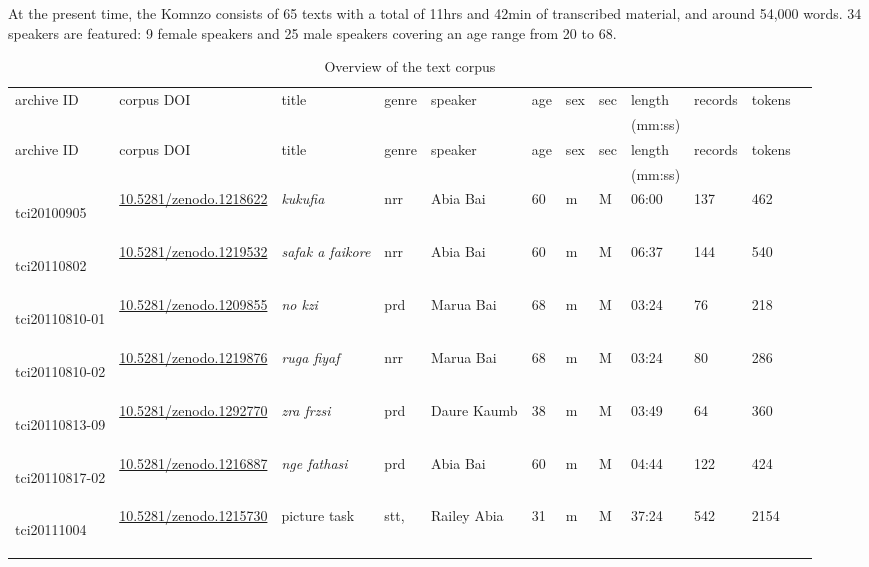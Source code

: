 At the present time, the Komnzo  consists of 65 texts with a total of 11hrs and 42min of transcribed material, and around 54,000 words. 34 speakers are featured: 9 female speakers and 25 male speakers covering an age range from 20 to 68.
\begin{landscape}
	{\renewcommand{\tabcolsep}{3pt}
\begin{longtable}{p{}lllllllllll}
\caption[Overview of the text corpus]{Overview of the text corpus}
\label{corpus}\\
	\lsptoprule
	archive ID & corpus DOI & title & genre & speaker & age & sex & sec & length & records & tokens\\
	& & & & & & & & (mm:ss) & &\\\hline
	\endfirsthead
	archive ID & corpus DOI & title & genre & speaker & age & sex & sec & length & records & tokens\\
	& & & & & & & & (mm:ss) & &\\\hline
	\endhead
	\hypertarget{tci20100905}{tci20100905} &\href{https://zenodo.org/record/1218622}{10.5281/zenodo.1218622}& \emph{kukufia} & nrr & Abia Bai & 60 & m & M & 06:00 & 137 &462\\\hline
	\hypertarget{tci20110802}{tci20110802} &\href{https://zenodo.org/record/1219532}{10.5281/zenodo.1219532}& \emph{safak a faikore} & nrr & Abia Bai & 60 & m & M & 06:37 & 144&540\\\hline
	\hypertarget{tci20110810-01}{tci20110810-01} &\href{https://zenodo.org/record/1209855}{10.5281/zenodo.1209855}& \emph{no kzi} & prd & Marua Bai & 68 & m & M & 03:24 & 76&218\\\hline
	\hypertarget{tci20110810-02}{tci20110810-02} &\href{https://zenodo.org/record/1219876}{10.5281/zenodo.1219876}& \emph{ruga fiyaf} & nrr & Marua Bai & 68 & m & M & 03:24 & 80&286\\\hline
	\hypertarget{tci20110813-09}{tci20110813-09} &\href{https://zenodo.org/record/1292770}{10.5281/zenodo.1292770}& \emph{zra frzsi} & prd & Daure Kaumb & 38 & m & M & 03:49 & 64&360\\\hline
	\hypertarget{tci20110817-02}{tci20110817-02} &\href{https://zenodo.org/record/1216887}{10.5281/zenodo.1216887}& \emph{nge fathasi} & prd & Abia Bai & 60 & m & M & 04:44 & 122&424\\\hline
	\multirow{3}{*}{\hypertarget{tci20111004}{tci20111004}}&\multirow{3}{*}{\href{https://zenodo.org/record/1215730}{10.5281/zenodo.1215730}}& \multirow{3}{*}{picture task} & \multirow{2}{*}{stt,} & Railey Abia & 31 & m & M & \multirow{3}{*}{37:24} & 542&2154\\

\end{longtable}}
\end{landscape}

